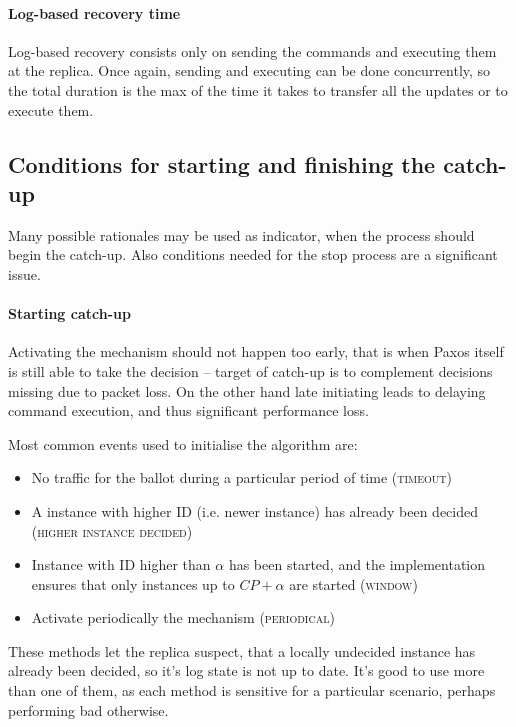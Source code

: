 \paragraph{Log-based recovery time}

Log-based recovery consists only on sending the commands and executing them at the replica. Once again, sending and executing can be done concurrently, so the total duration is the max of the time it takes to transfer all the updates or to execute them.

\subsection{Conditions for starting and finishing the catch-up}
\label{subsec:conditions_for_starting_and_finishing_the_catch_up}
Many possible rationales may be used as indicator, when the process should begin the catch-up. Also conditions needed for the stop process are a significant issue.

\paragraph*{Starting catch-up}
Activating the mechanism should not happen too early, that is when Paxos itself is still able to take the decision -- target of catch-up is to complement decisions missing due to packet loss. On the other hand late initiating leads to delaying command execution, and thus significant performance loss.

Most common events used to initialise the algorithm are:
\begin{itemize}
  \item No traffic for the ballot during a particular period of time (\textsc{timeout})
  \item A instance with higher ID (i.e. newer instance) has already been decided (\textsc{higher instance decided})
  \item Instance with ID higher than $\alpha$ has been started, and the implementation ensures that only instances up to $CP+\alpha$ are started (\textsc{window})
  \item Activate periodically the mechanism (\textsc{periodical})
\end{itemize}

These methods let the replica suspect, that a locally undecided instance has already been decided, so it's log state is not up to date. It's good to use more than one of them, as each method is sensitive for a particular scenario, perhaps performing bad otherwise.

